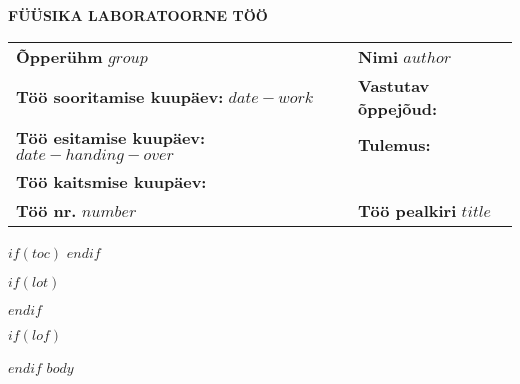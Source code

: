 \documentclass[
	a4paper, %
	12pt, %
	onecolumn,
	twoside
]{CSUniSchoolLabReport}
\author{$author$} %
\date{\today} %
\begin{document}
\setlength{\parskip}{12pt}
\renewcommand{\arraystretch}{1}
\setlength\arrayrulewidth{1pt}
\begin{center}
\textbf{\textsf{FÜÜSIKA LABORATOORNE TÖÖ}} \\
\end{center}
\vspace{1cm}
\renewcommand{\arraystretch}{2}
\setlength\arrayrulewidth{1pt}
\begin{tabular}{|m{}|m{}|m{}|}
\hline
    \multicolumn{2}{|m{0.4\textwidth}|}{\textbf{Õpperühm} $group$} & {\textbf{Nimi} $author$}  \\ \cline{1-3}
    \multicolumn{2}{|m{0.4\textwidth}|}{\raggedright\textbf{Töö sooritamise kuupäev:} $date-work$} & {\textbf{Vastutav õppejõud:}} \\ \cline{1-3}
    \multicolumn{2}{|m{0.4\textwidth}|}{\raggedright\textbf{Töö esitamise kuupäev:} $date-handing-over$} & {\textbf{Tulemus:}} \\ \cline{1-2}
    \multicolumn{2}{|m{0.4\textwidth}|}{\textbf{Töö kaitsmise kuupäev:} } & \\ \cline{1-3}
    {\textbf{Töö nr.} $number$} & \multicolumn{2}{|m{0.8\textwidth}|}{\textbf{Töö pealkiri} \hfill \LARGE{$title$}} \\ \hline
\end{tabular}

$if(toc)$
  \setcounter{secnumdepth}{$toc-depth$}
  \setcounter{tocdepth}{$toc-depth$}
  \tableofcontents
$endif$

$if(lot)$
  \listoftables
$endif$

$if(lof)$
  \listoffigures
$endif$
$body$
\end{document}
